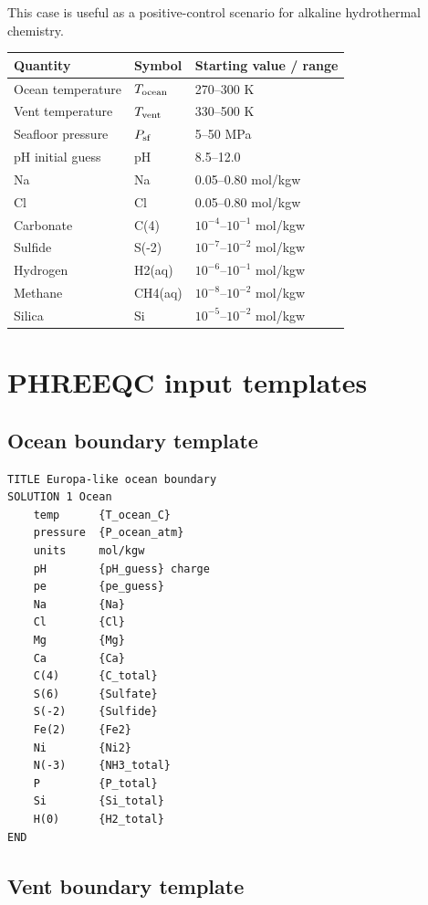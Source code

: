 \documentclass[11pt]{article}
\newcommand{\SIrange}[3]{#1--#2 #3}
\begin{document}
This case is useful as a positive-control scenario for alkaline hydrothermal chemistry.
\begin{longtable}{lll}
\toprule
Quantity & Symbol & Starting value / range \\
\midrule
Ocean temperature & $T_{\rm ocean}$ & \SIrange{270}{300}{K} \\
Vent temperature & $T_{\rm vent}$ & \SIrange{330}{500}{K} \\
Seafloor pressure & $P_{\rm sf}$ & \SIrange{5}{50}{MPa} \\
pH initial guess & pH & 8.5--12.0 \\
Na & Na & 0.05--0.80 mol/kgw \\
Cl & Cl & 0.05--0.80 mol/kgw \\
Carbonate & C(4) & $10^{-4}$--$10^{-1}$ mol/kgw \\
Sulfide & S(-2) & $10^{-7}$--$10^{-2}$ mol/kgw \\
Hydrogen & H2(aq) & $10^{-6}$--$10^{-1}$ mol/kgw \\
Methane & CH4(aq) & $10^{-8}$--$10^{-2}$ mol/kgw \\
Silica & Si & $10^{-5}$--$10^{-2}$ mol/kgw \\
\bottomrule
\end{longtable}

\section{PHREEQC input templates}

\subsection{Ocean boundary template}

\begin{verbatim}
TITLE Europa-like ocean boundary
SOLUTION 1 Ocean
    temp      {T_ocean_C}
    pressure  {P_ocean_atm}
    units     mol/kgw
    pH        {pH_guess} charge
    pe        {pe_guess}
    Na        {Na}
    Cl        {Cl}
    Mg        {Mg}
    Ca        {Ca}
    C(4)      {C_total}
    S(6)      {Sulfate}
    S(-2)     {Sulfide}
    Fe(2)     {Fe2}
    Ni        {Ni2}
    N(-3)     {NH3_total}
    P         {P_total}
    Si        {Si_total}
    H(0)      {H2_total}
END
\end{verbatim}

\subsection{Vent boundary template}
\end{document}
